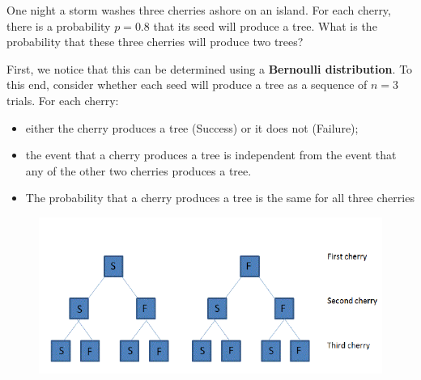 \documentclass[smaller, handout]{beamer}\usepackage[]{graphicx}\usepackage[]{color}
\begin{document}
\begin{frame}{\secname}%



\begin{example} 

One night a storm washes three cherries ashore on an island. For each cherry, there is a probability $p=0.8$ that its seed will
produce a tree. What is the probability that these three cherries will produce two
trees?

\bigskip

First,  we notice that this can be determined using a \textbf{Bernoulli distribution}. To this end, consider whether each seed will produce a tree as a sequence of $n=3$
trials. For each cherry:

\begin{itemize}

\item either the cherry produces a tree (Success) or it
does not (Failure);
\item the event that a cherry produces a tree is independent from the event
that any of the other two cherries produces a tree.

\item The probability that a cherry produces a tree is the same for all
three cherries
\end{itemize}

\end{example}

\end{frame}%


\begin{frame}{\secname}%


\begin{example}[continued]

\begin{figure}[ptb]\centering
\includegraphics[]{img/BINOMIALpic__1.pdf}
\end{figure}

\end{example}
\end{frame}%
\end{document}
